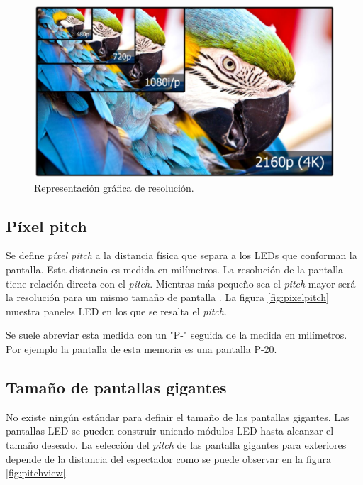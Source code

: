 \begin{figure}[htpb]
	\centering
	\includegraphics[scale=0.3]{Figures/resolucion.jpg} 
	\caption{Representación gráfica de resolución\protect\footnotemark.}
	\label{fig:grafresolucion}
\end{figure}

\subsection{Píxel pitch}
Se define \textit{píxel pitch} a la distancia física que separa a los LEDs que conforman la pantalla. Esta distancia es medida en milímetros. La resolución de la pantalla tiene relación directa con el \textit{pitch}. Mientras más pequeño sea el \textit{pitch} mayor será la resolución para un mismo tamaño de pantalla \citep{IMAGENDEF2}. La figura \ref{fig:pixelpitch} muestra paneles LED en los que se resalta el \textit{pitch}.

Se suele abreviar esta medida con un "P-" seguida de la medida en milímetros. Por ejemplo la pantalla de esta memoria es una pantalla P-20.



\subsection{Tamaño de pantallas gigantes}
No existe ningún estándar para definir el tamaño de las pantallas gigantes. Las pantallas LED  se pueden construir uniendo módulos LED hasta alcanzar el tamaño deseado. La selección del \textit{pitch} de las pantalla gigantes para exteriores depende de la distancia del espectador como se puede observar en la figura \ref{fig:pitchview}.

